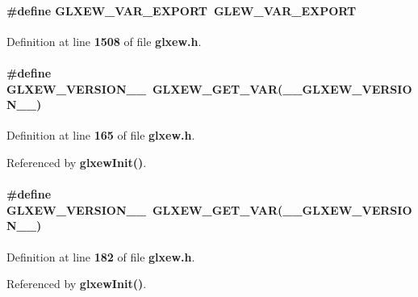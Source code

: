 \paragraph[{G\+L\+X\+E\+W\+\_\+\+V\+A\+R\+\_\+\+E\+X\+P\+O\+RT}]{\setlength{\rightskip}{0pt plus 5cm}\#define G\+L\+X\+E\+W\+\_\+\+V\+A\+R\+\_\+\+E\+X\+P\+O\+RT~{\bf G\+L\+E\+W\+\_\+\+V\+A\+R\+\_\+\+E\+X\+P\+O\+RT}}\label{glxew_8h_a0fb3259244e3bb85283a7e4f6999a4ee}


Definition at line {\bf 1508} of file {\bf glxew.\+h}.

\paragraph[{G\+L\+X\+E\+W\+\_\+\+V\+E\+R\+S\+I\+O\+N\+\_\+1\+\_\+0}]{\setlength{\rightskip}{0pt plus 5cm}\#define G\+L\+X\+E\+W\+\_\+\+V\+E\+R\+S\+I\+O\+N\+\_\+\_~{\bf G\+L\+X\+E\+W\+\_\+\+G\+E\+T\+\_\+\+V\+AR}({\bf \+\_\+\+\_\+\+G\+L\+X\+E\+W\+\_\+\+V\+E\+R\+S\+I\+O\+N\+\_\+\_})}\label{glxew_8h_a6b325640307d0ae52d7e36fc8f7e3456}


Definition at line {\bf 165} of file {\bf glxew.\+h}.



Referenced by {\bf glxew\+Init()}.

\paragraph[{G\+L\+X\+E\+W\+\_\+\+V\+E\+R\+S\+I\+O\+N\+\_\+1\+\_\+1}]{\setlength{\rightskip}{0pt plus 5cm}\#define G\+L\+X\+E\+W\+\_\+\+V\+E\+R\+S\+I\+O\+N\+\_\+\_~{\bf G\+L\+X\+E\+W\+\_\+\+G\+E\+T\+\_\+\+V\+AR}({\bf \+\_\+\+\_\+\+G\+L\+X\+E\+W\+\_\+\+V\+E\+R\+S\+I\+O\+N\+\_\+\_})}\label{glxew_8h_aaedf11c88b0c9cd3274418ab89c8a1b9}


Definition at line {\bf 182} of file {\bf glxew.\+h}.



Referenced by {\bf glxew\+Init()}.


